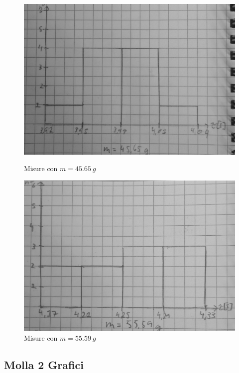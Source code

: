 \documentclass[a4paper]{article}
\begin{document}
{\begin{figure}[!htbp]
\begin{minipage}[b]{0.45\textwidth}
        \includegraphics[width=\textwidth]{fotomolla/Molla 1/45.jpg}
        \caption{Misure con $m=\SI{45.65}{g}$}
    \end{minipage}
    \hfil
     \begin{minipage}[b]{0.45\textwidth}
        \includegraphics[width=\textwidth]{fotomolla/Molla 1/55.jpg}
        \caption{Misure con $m=\SI{55.59}{g}$}
    \end{minipage}
\end{figure}
\FloatBarrier

\subsection{Molla 2 Grafici}
}
\end{document}
